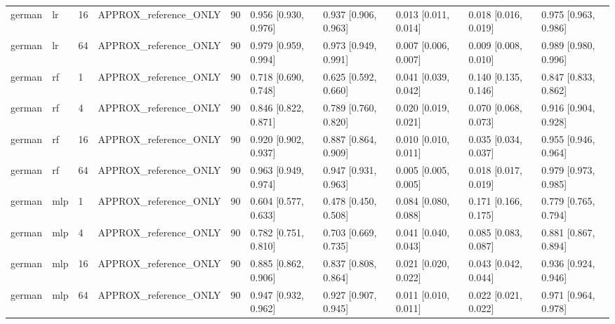 \begin{tabular}{llllllllll}
german & lr & 16 & APPROX\_reference\_ONLY & 90 & 0.956 [0.930, 0.976] & 0.937 [0.906, 0.963] & 0.013 [0.011, 0.014] & 0.018 [0.016, 0.019] & 0.975 [0.963, 0.986] \\
german & lr & 64 & APPROX\_reference\_ONLY & 90 & 0.979 [0.959, 0.994] & 0.973 [0.949, 0.991] & 0.007 [0.006, 0.007] & 0.009 [0.008, 0.010] & 0.989 [0.980, 0.996] \\
german & rf & 1 & APPROX\_reference\_ONLY & 90 & 0.718 [0.690, 0.748] & 0.625 [0.592, 0.660] & 0.041 [0.039, 0.042] & 0.140 [0.135, 0.146] & 0.847 [0.833, 0.862] \\
german & rf & 4 & APPROX\_reference\_ONLY & 90 & 0.846 [0.822, 0.871] & 0.789 [0.760, 0.820] & 0.020 [0.019, 0.021] & 0.070 [0.068, 0.073] & 0.916 [0.904, 0.928] \\
german & rf & 16 & APPROX\_reference\_ONLY & 90 & 0.920 [0.902, 0.937] & 0.887 [0.864, 0.909] & 0.010 [0.010, 0.011] & 0.035 [0.034, 0.037] & 0.955 [0.946, 0.964] \\
german & rf & 64 & APPROX\_reference\_ONLY & 90 & 0.963 [0.949, 0.974] & 0.947 [0.931, 0.963] & 0.005 [0.005, 0.005] & 0.018 [0.017, 0.019] & 0.979 [0.973, 0.985] \\
german & mlp & 1 & APPROX\_reference\_ONLY & 90 & 0.604 [0.577, 0.633] & 0.478 [0.450, 0.508] & 0.084 [0.080, 0.088] & 0.171 [0.166, 0.175] & 0.779 [0.765, 0.794] \\
german & mlp & 4 & APPROX\_reference\_ONLY & 90 & 0.782 [0.751, 0.810] & 0.703 [0.669, 0.735] & 0.041 [0.040, 0.043] & 0.085 [0.083, 0.087] & 0.881 [0.867, 0.894] \\
german & mlp & 16 & APPROX\_reference\_ONLY & 90 & 0.885 [0.862, 0.906] & 0.837 [0.808, 0.864] & 0.021 [0.020, 0.022] & 0.043 [0.042, 0.044] & 0.936 [0.924, 0.946] \\
german & mlp & 64 & APPROX\_reference\_ONLY & 90 & 0.947 [0.932, 0.962] & 0.927 [0.907, 0.945] & 0.011 [0.010, 0.011] & 0.022 [0.021, 0.022] & 0.971 [0.964, 0.978] \\
\bottomrule
\end{tabular}
